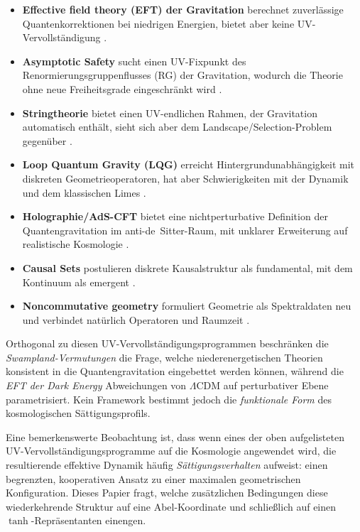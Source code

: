 \documentclass[aps,prd,twocolumn,superscriptaddress,nofootinbib]{revtex4-2}
\begin{document}
\begin{itemize}
\item \textbf{Effective field theory (EFT) der Gravitation} berechnet zuverlässige Quantenkorrektionen bei niedrigen Energien, bietet aber keine UV-Vervollständigung \cite{Donoghue1994}.
\item \textbf{Asymptotic Safety} sucht einen UV-Fixpunkt des Renormierungsgruppenflusses (RG) der Gravitation, wodurch die Theorie ohne neue Freiheitsgrade eingeschränkt wird \cite{Weinberg1979,Reuter1998,Percacci2017}.
\item \textbf{Stringtheorie} bietet einen UV-endlichen Rahmen, der Gravitation automatisch enthält, sieht sich aber dem Landscape/Selection-Problem gegenüber \cite{Polchinski1998}.
\item \textbf{Loop Quantum Gravity (LQG)} erreicht Hintergrundunabhängigkeit mit diskreten Geometrieoperatoren, hat aber Schwierigkeiten mit der Dynamik und dem klassischen Limes \cite{Rovelli2004,Thiemann2007}.
\item \textbf{Holographie/AdS-CFT} bietet eine nichtperturbative Definition der Quantengravitation im anti-de~Sitter-Raum, mit unklarer Erweiterung auf realistische Kosmologie \cite{Maldacena1999}.
\item \textbf{Causal Sets} postulieren diskrete Kausalstruktur als fundamental, mit dem Kontinuum als emergent \cite{Sorkin2003,Surya2019}.
\item \textbf{Noncommutative geometry} formuliert Geometrie als Spektraldaten neu und verbindet natürlich Operatoren und Raumzeit \cite{Connes1994}.
\end{itemize}

Orthogonal zu diesen UV-Vervollständigungsprogrammen beschränken die \textit{Swampland-Vermutungen} \cite{Obied2018} die Frage, welche niederenergetischen Theorien konsistent in die Quantengravitation eingebettet werden können, während die \textit{EFT der Dark Energy} \cite{Gubitosi2013} Abweichungen von $\Lambda$CDM auf perturbativer Ebene parametrisiert. Kein Framework bestimmt jedoch die \textit{funktionale Form} des kosmologischen Sättigungsprofils.

Eine bemerkenswerte Beobachtung ist, dass wenn eines der oben aufgelisteten UV-Vervollständigungsprogramme auf die Kosmologie angewendet wird, die resultierende effektive Dynamik häufig \textit{Sättigungsverhalten} aufweist: einen begrenzten, kooperativen Ansatz zu einer maximalen geometrischen Konfiguration. Dieses Papier fragt, welche zusätzlichen Bedingungen diese wiederkehrende Struktur auf eine Abel-Koordinate und schließlich auf einen $\tanh$-Repräsentanten einengen.
\end{document}
